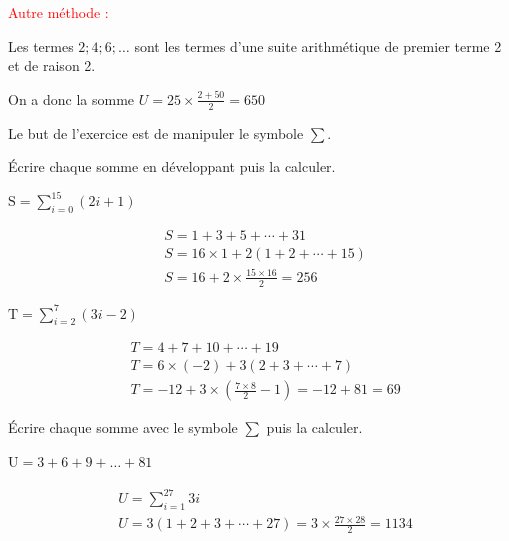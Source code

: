 \documentclass[11pt,a4paper]{article}  %
\begin{document}
\begin{enumMet}
\begin{corrBox}
		
		\textcolor{red}{Autre méthode :}
		
		Les termes $2 ; 4 ; 6 ; \ldots$ sont les termes d'une suite arithmétique de premier terme 2 et de raison 2.

		On a donc la somme $U=25 \times \frac{2+50}{2}=650$		
	\end{corrBox}
\end{enumMet}


Le but de l'exercice est de manipuler le symbole $\sum$.
\begin{enumMet}
	\item Écrire chaque somme en développant puis la calculer.
		\begin{enumMet}
		\item $\mathrm{S}=\sum_{i=0}^{15}(2 i+1)$
		\begin{corrBox}
			$$
			\begin{aligned}
				& S=1+3+5+\cdots+31 \\
				& S=16 \times 1+2(1+2+\cdots+15) \\
				& S=16+2 \times \frac{15 \times 16}{2}=256
			\end{aligned}
			$$		
		\end{corrBox}
		\item $\mathrm{T}=\sum_{i=2}^7(3 i-2)$
		\begin{corrBox}
			$$
			\begin{aligned}
				& T=4+7+10+\cdots+19 \\
				& T=6 \times(-2)+3(2+3+\cdots+7) \\
				& T=-12+3 \times\left(\frac{7 \times 8}{2}-1\right)=-12+81=69
			\end{aligned}
			$$		
		\end{corrBox}
	\end{enumMet}
	\item Écrire chaque somme avec le symbole $\sum$ puis la calculer.
		\begin{enumMet}
		\item $\mathrm{U}=3+6+9+\ldots+81$
		\begin{corrBox}
			$$
			\begin{aligned}
				& U=\sum_{i=1}^{27} 3 i \\
				& U=3(1+2+3+\cdots+27)=3 \times \frac{27 \times 28}{2}=1134

\end{aligned}$$
\end{corrBox}
\end{enumMet}
\end{enumMet}
\end{document}
